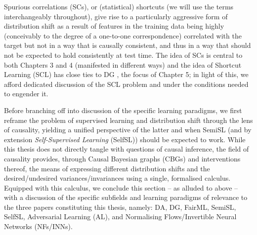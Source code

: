 %
Spurious correlations (SCs), or (statistical) shortcuts (we will use the terms interchangeably
throughout), give rise to a particularly aggressive form of distribution shift as a result of
features in the training data being highly (conceivably to the degree of a one-to-one
correspondence) correlated with the target but not in a way that is causally consistent, and thus
in a way that should not be expected to hold consistently at test time. 
%
The idea of SCs is central to both Chapters 3 and 4 (manifested in different ways) and the idea of
Shortcut Learning (SCL) has close ties to DG \citep{arjovsky2019invariant}, the focus of Chapter 5;
in light of this, we afford dedicated discussion of the SCL problem and under the conditions needed
to engender it.

%
Before branching off into discussion of the specific learning paradigms, we first reframe the
problem of supervised learning and distribution shift through the lens of causality, yielding a
unified perspective of the latter and when SemiSL (and by extension \emph{Self-Supervised
Learning} (SelfSL)) should be expected to work.
%
While this thesis does not directly tangle with questions of causal inference, the field of
causality \citep{pearl2009causality} provides, through Causal Bayesian graphs (CBGs) and
interventions thereof, the means of expressing different distribution shifts and the
desired/undesired variances/invariances using a single, formalised calculus.
%
Equipped with this calculus, we conclude this section -- as alluded to above -- with a discussion
of the specific subfields and learning paradigms of relevance to the three papers constituting this
thesis, namely:  DA, DG, FairML, SemiSL, SelfSL, Adversarial Learning (AL), and Normalising
Flows/Invertible Neural Networks (NFs/INNs).

